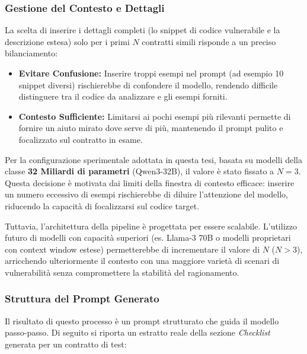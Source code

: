 \subsubsection{Gestione del Contesto e Dettagli}
La scelta di inserire i dettagli completi (lo snippet di codice vulnerabile e la descrizione estesa) solo per i primi $N$ contratti simili risponde a un preciso bilanciamento:
\begin{itemize}
    \item \textbf{Evitare Confusione:} Inserire troppi esempi nel prompt (ad esempio 10 snippet diversi) rischierebbe di confondere il modello, rendendo difficile distinguere tra il codice da analizzare e gli esempi forniti.
    \item \textbf{Contesto Sufficiente:} Limitarsi ai pochi esempi più rilevanti permette di fornire un aiuto mirato dove serve di più, mantenendo il prompt pulito e focalizzato sul contratto in esame.
\end{itemize}

Per la configurazione sperimentale adottata in questa tesi, basata su modelli della classe \textbf{32 Miliardi di parametri} (Qwen3-32B), il valore è stato fissato a \textbf{$N=3$}. Questa decisione è motivata dai limiti della finestra di contesto efficace: inserire un numero eccessivo di esempi rischierebbe di diluire l'attenzione del modello, riducendo la capacità di focalizzarsi sul codice target.

Tuttavia, l'architettura della pipeline è progettata per essere scalabile. L'utilizzo futuro di modelli con capacità superiori (es. Llama-3 70B o modelli proprietari con context window estese) permetterebbe di incrementare il valore di $N$ ($N > 3$), arricchendo ulteriormente il contesto con una maggiore varietà di scenari di vulnerabilità senza compromettere la stabilità del ragionamento.

\subsubsection{Struttura del Prompt Generato}
Il risultato di questo processo è un prompt strutturato che guida il modello passo-passo. Di seguito si riporta un estratto reale della sezione \textit{Checklist} generata per un contratto di test:

